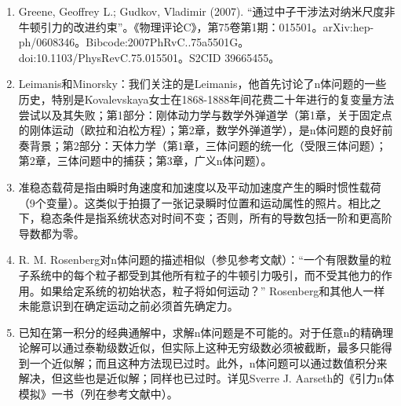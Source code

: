 \begin{enumerate}
\item  Greene, Geoffrey L.; Gudkov, Vladimir (2007). “通过中子干涉法对纳米尺度非牛顿引力的改进约束”。《物理评论C》，第75卷第1期：015501。arXiv:hep-ph/0608346。Bibcode:2007PhRvC..75a5501G。doi:10.1103/PhysRevC.75.015501。S2CID 39665455。
\item Leimanis和Minorsky：我们关注的是Leimanis，他首先讨论了n体问题的一些历史，特别是Kovalevskaya女士在1868-1888年间花费二十年进行的复变量方法尝试以及其失败；第1部分：刚体动力学与数学外弹道学（第1章，关于固定点的刚体运动（欧拉和泊松方程）；第2章，数学外弹道学），是n体问题的良好前奏背景；第2部分：天体力学（第1章，三体问题的统一化（受限三体问题）；第2章，三体问题中的捕获；第3章，广义n体问题）。
\item 准稳态载荷是指由瞬时角速度和加速度以及平动加速度产生的瞬时惯性载荷（9个变量）。这类似于拍摄了一张记录瞬时位置和运动属性的照片。相比之下，稳态条件是指系统状态对时间不变；否则，所有的导数包括一阶和更高阶导数都为零。
\item R. M. Rosenberg对n体问题的描述相似（参见参考文献）：“一个有限数量的粒子系统中的每个粒子都受到其他所有粒子的牛顿引力吸引，而不受其他力的作用。如果给定系统的初始状态，粒子将如何运动？” Rosenberg和其他人一样未能意识到在确定运动之前必须首先确定力。
\item 已知在第一积分的经典通解中，求解n体问题是不可能的。对于任意n的精确理论解可以通过泰勒级数近似，但实际上这种无穷级数必须被截断，最多只能得到一个近似解；而且这种方法现已过时。此外，n体问题可以通过数值积分来解决，但这些也是近似解；同样也已过时。详见Sverre J. Aarseth的《引力n体模拟》一书（列在参考文献中）。
\end{enumerate}